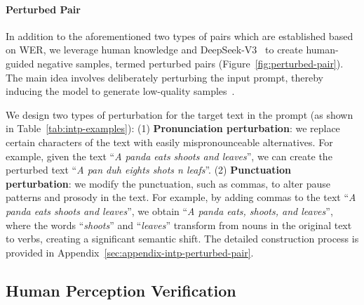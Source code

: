 \documentclass[11pt]{article}
\begin{document}
\paragraph{Perturbed Pair}\label{sec:human-guided-negative}
In addition to the aforementioned two types of pairs which are established based on WER, we leverage human knowledge and DeepSeek-V3~\cite{deepseek-v3} to create human-guided negative samples, termed perturbed pairs (Figure~\ref{fig:perturbed-pair}). The main idea involves deliberately perturbing the input prompt, thereby inducing the model to generate low-quality samples~\cite{tango2,tldr-perturb-vision}. 

We design two types of perturbation for the target text in the prompt (as shown in Table~\ref{tab:intp-examples}): (1) \textbf{Pronunciation perturbation}: we replace certain characters of the text with easily mispronounceable alternatives. For example, given the text ``\textit{A panda eats shoots and leaves}'', we can create the perturbed text ``\textit{A pan duh eights shots n leafs}''. (2) \textbf{Punctuation perturbation}: we modify the punctuation, such as commas, to alter pause patterns and prosody in the text. For example, by adding commas to the text ``\textit{A panda eats shoots and leaves}'', we obtain ``\textit{A panda eats, shoots, and leaves}'', where the words ``\textit{shoots}'' and ``\textit{leaves}'' transform from nouns in the original text to verbs, creating a significant semantic shift. The detailed construction process is provided in Appendix~\ref{sec:appendix-intp-perturbed-pair}.


\subsection{Human Perception Verification}\label{sec:intp-human-verify}
\end{document}
